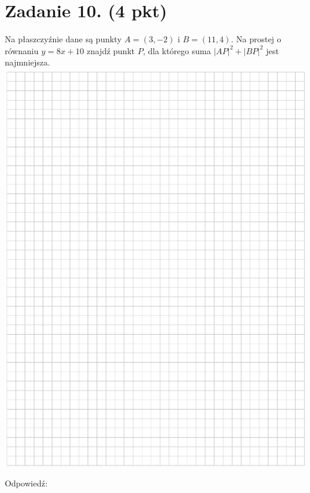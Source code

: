 \documentclass[10pt]{article}
\begin{document}
\section*{Zadanie 10. (4 pkt)}
Na płaszczyźnie dane są punkty \(A=(3,-2)\) i \(B=(11,4)\). Na prostej o równaniu \(y=8 x+10\) znajdź punkt \(P\), dla którego suma \(|A P|^{2}+|B P|^{2}\) jest najmniejsza.\\
\includegraphics[max width=\textwidth, center]{2024_11_21_d9af6ed2d610d3f2d2cbg-15}

Odpowiedź:
\end{document}
